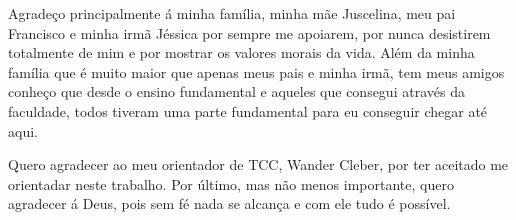 \begin{agradecimentos}
    Agradeço principalmente á minha família, minha mãe Juscelina, meu pai Francisco e minha irmã Jéssica por sempre me apoiarem, por nunca desistirem totalmente de mim e por mostrar os valores morais da vida. Além da minha família que é muito maior que apenas meus pais e minha irmã, tem meus amigos conheço que desde o ensino fundamental e aqueles que consegui através da faculdade, todos tiveram uma parte fundamental para eu conseguir chegar até aqui.
    
    Quero agradecer ao meu orientador de TCC, Wander Cleber, por ter aceitado me orientadar neste trabalho. Por último, mas não menos importante, quero agradecer á Deus, pois sem fé nada se alcança e com ele tudo é possível. 
\end{agradecimentos}

